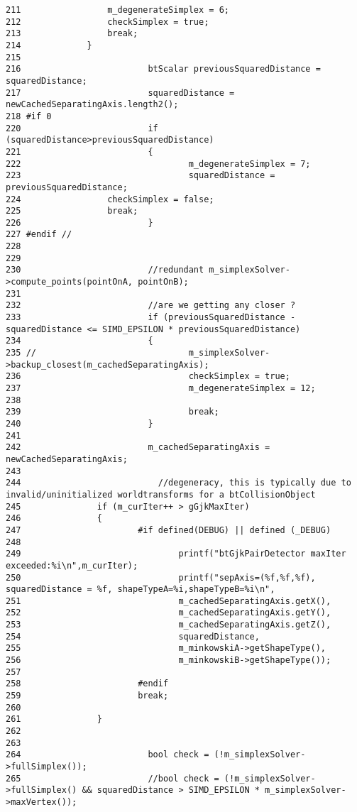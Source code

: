 \begin{Code}
\begin{verbatim}
211                 m_degenerateSimplex = 6;
212                 checkSimplex = true;
213                 break;
214             }
215 
216                         btScalar previousSquaredDistance = squaredDistance;
217                         squaredDistance = newCachedSeparatingAxis.length2();
218 #if 0
220                         if (squaredDistance>previousSquaredDistance)
221                         {
222                                 m_degenerateSimplex = 7;
223                                 squaredDistance = previousSquaredDistance;
224                 checkSimplex = false;
225                 break;
226                         }
227 #endif //
228                         
229 
230                         //redundant m_simplexSolver->compute_points(pointOnA, pointOnB);
231 
232                         //are we getting any closer ?
233                         if (previousSquaredDistance - squaredDistance <= SIMD_EPSILON * previousSquaredDistance) 
234                         { 
235 //                              m_simplexSolver->backup_closest(m_cachedSeparatingAxis);
236                                 checkSimplex = true;
237                                 m_degenerateSimplex = 12;
238                                 
239                                 break;
240                         }
241 
242                         m_cachedSeparatingAxis = newCachedSeparatingAxis;
243 
244                           //degeneracy, this is typically due to invalid/uninitialized worldtransforms for a btCollisionObject   
245               if (m_curIter++ > gGjkMaxIter)   
246               {   
247                       #if defined(DEBUG) || defined (_DEBUG)
248 
249                               printf("btGjkPairDetector maxIter exceeded:%i\n",m_curIter);   
250                               printf("sepAxis=(%f,%f,%f), squaredDistance = %f, shapeTypeA=%i,shapeTypeB=%i\n",   
251                               m_cachedSeparatingAxis.getX(),   
252                               m_cachedSeparatingAxis.getY(),   
253                               m_cachedSeparatingAxis.getZ(),   
254                               squaredDistance,   
255                               m_minkowskiA->getShapeType(),   
256                               m_minkowskiB->getShapeType());   
257 
258                       #endif   
259                       break;   
260 
261               } 
262 
263 
264                         bool check = (!m_simplexSolver->fullSimplex());
265                         //bool check = (!m_simplexSolver->fullSimplex() && squaredDistance > SIMD_EPSILON * m_simplexSolver->maxVertex());

\end{verbatim}
\end{Code}

